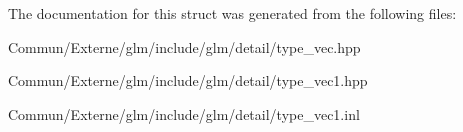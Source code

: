 The documentation for this struct was generated from the following files\+:\begin{DoxyCompactItemize}
\item 
Commun/\+Externe/glm/include/glm/detail/type\+\_\+vec.\+hpp\item 
Commun/\+Externe/glm/include/glm/detail/type\+\_\+vec1.\+hpp\item 
Commun/\+Externe/glm/include/glm/detail/type\+\_\+vec1.\+inl\end{DoxyCompactItemize}

